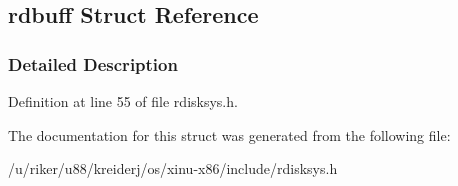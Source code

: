\hypertarget{structrdbuff}{}\subsection{rdbuff Struct Reference}
\label{structrdbuff}


\subsubsection{Detailed Description}


Definition at line 55 of file rdisksys.\+h.



The documentation for this struct was generated from the following file\+:\begin{DoxyCompactItemize}
\item 
/u/riker/u88/kreiderj/os/xinu-\/x86/include/rdisksys.\+h\end{DoxyCompactItemize}
